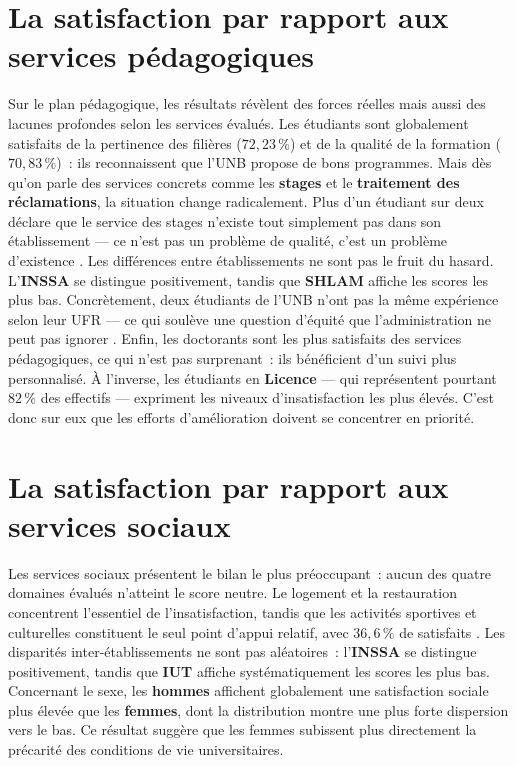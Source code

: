 \documentclass[
12pt,          %
a4paper,       %
oneside,      %
openright      %
]{report}          %
\begin{document}
		\section{La satisfaction par rapport aux services pédagogiques}
		Sur le plan p\'edagogique, les r\'esultats
		r\'ev\`elent des forces r\'eelles mais aussi
		des lacunes profondes selon les services
		\'evalu\'es. Les \'etudiants sont globalement
		satisfaits de la pertinence des fili\`eres
		($72{,}23\,\%$) et de la qualit\'e de la formation
		($70{,}83\,\%$)~: ils reconnaissent que l'UNB propose
		de bons programmes. Mais d\`es qu'on parle des
		services concrets comme les \textbf{stages} et le
		\textbf{traitement des r\'eclamations}, la situation
		change radicalement. Plus d'un \'etudiant sur deux
		d\'eclare que le service des stages n'existe tout
		simplement pas dans son \'etablissement --- ce n'est
		pas un probl\`eme de qualit\'e, c'est un probl\`eme
		d'existence \citep{marzo2005}.
		Les diff\'erences entre \'etablissements ne sont pas
		le fruit du hasard. L'\textbf{INSSA} se distingue
		positivement, tandis que \textbf{SHLAM} affiche les
		scores les plus bas. Concr\`etement, deux \'etudiants
		de l'UNB n'ont pas la m\^eme exp\'erience selon leur
		UFR --- ce qui soul\`eve une question d'\'equit\'e
		que l'administration ne peut pas ignorer
		\citep{kuh2006}.
		Enfin, les doctorants sont les plus satisfaits des
		services p\'edagogiques, ce qui n'est pas
		surprenant~: ils b\'en\'eficient d'un suivi plus
		personnalis\'e. \`A l'inverse, les \'etudiants en
		\textbf{Licence} --- qui repr\'esentent pourtant
		$82\,\%$ des effectifs --- expriment les niveaux
		d'insatisfaction les plus \'elev\'es. C'est donc
		sur eux que les efforts d'am\'elioration doivent
		se concentrer en priorit\'e.
		
		
		\section{La satisfaction par rapport aux services sociaux}
			Les services sociaux pr\'esentent le bilan le plus
		pr\'eoccupant~: aucun des quatre domaines \'evalu\'es
		n'atteint le score neutre. Le logement et la restauration
		concentrent l'essentiel de l'insatisfaction, tandis que
		les activit\'es sportives et culturelles constituent le
		seul point d'appui relatif, avec $36{,}6\,\%$ de
		satisfaits \citep{amole2009}.
		Les disparit\'es inter-\'etablissements ne sont pas
		al\'eatoires~: l'\textbf{INSSA} se distingue positivement, tandis que
		\textbf{IUT} affiche syst\'ematiquement les scores les
		plus bas.
		Concernant le sexe, les \textbf{hommes} affichent
		globalement une satisfaction sociale plus \'elev\'ee
		que les \textbf{femmes}, dont la distribution montre
		une plus forte dispersion vers le bas. Ce r\'esultat
		sugg\`ere que les femmes 
		subissent plus directement la pr\'ecarit\'e des
		conditions de vie universitaires. 
		
\end{document}
